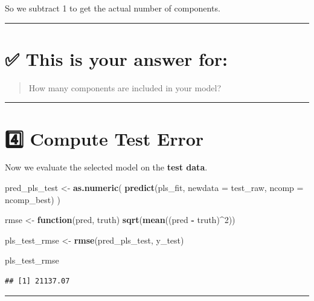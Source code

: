 \documentclass[
]{article}
\newenvironment{Shaded}{\begin{snugshade}}{\end{snugshade}}
\newcommand{\AttributeTok}[1]{\textcolor[rgb]{0.13,0.29,0.53}{#1}}
\newcommand{\ControlFlowTok}[1]{\textcolor[rgb]{0.13,0.29,0.53}{\textbf{#1}}}
\newcommand{\DecValTok}[1]{\textcolor[rgb]{0.00,0.00,0.81}{#1}}
\newcommand{\FunctionTok}[1]{\textcolor[rgb]{0.13,0.29,0.53}{\textbf{#1}}}
\newcommand{\NormalTok}[1]{#1}
\newcommand{\OtherTok}[1]{\textcolor[rgb]{0.56,0.35,0.01}{#1}}
\newcommand{\SpecialCharTok}[1]{\textcolor[rgb]{0.81,0.36,0.00}{\textbf{#1}}}
\begin{document}
So we subtract 1 to get the actual number of components.

\begin{center}\rule{0.5\linewidth}{0.5pt}\end{center}

\section{✅ This is your answer for:}\label{this-is-your-answer-for}

\begin{quote}
How many components are included in your model?
\end{quote}

\begin{center}\rule{0.5\linewidth}{0.5pt}\end{center}

\section{4️⃣ Compute Test Error}\label{compute-test-error-1}

Now we evaluate the selected model on the \textbf{test data}.

\begin{Shaded}
\begin{Highlighting}[]
\NormalTok{pred\_pls\_test }\OtherTok{\textless{}{-}} \FunctionTok{as.numeric}\NormalTok{(}
  \FunctionTok{predict}\NormalTok{(pls\_fit, }\AttributeTok{newdata =}\NormalTok{ test\_raw, }\AttributeTok{ncomp =}\NormalTok{ ncomp\_best)}
\NormalTok{)}

\NormalTok{rmse }\OtherTok{\textless{}{-}} \ControlFlowTok{function}\NormalTok{(pred, truth) }\FunctionTok{sqrt}\NormalTok{(}\FunctionTok{mean}\NormalTok{((pred }\SpecialCharTok{{-}}\NormalTok{ truth)}\SpecialCharTok{\^{}}\DecValTok{2}\NormalTok{))}

\NormalTok{pls\_test\_rmse }\OtherTok{\textless{}{-}} \FunctionTok{rmse}\NormalTok{(pred\_pls\_test, y\_test)}

\NormalTok{pls\_test\_rmse}
\end{Highlighting}
\end{Shaded}

\begin{verbatim}
## [1] 21137.07
\end{verbatim}

\begin{center}\rule{0.5\linewidth}{0.5pt}\end{center}
\end{document}
